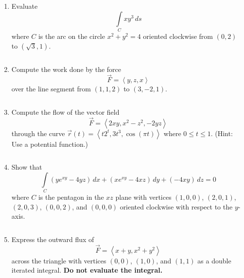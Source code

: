 \documentclass[12pt]{article}
\newcommand{\up}{$~$\vspace*{-0.7in}}
\newcommand{\liner}{\noindent\underline{\hspace*{7in}}}
\begin{document}
\begin{enumerate}

\item Evaluate \[ \int\limits_C xy^3\,ds\] where $C$ is the arc on the circle $x^2+y^2=4$ oriented clockwise from $(0,2)$ to $(\sqrt{3},1)$.

\vspace*{8in}

\liner

\newpage\up


\item Compute the work done by the force \[\vec{F}=\left<y,z,x\right>\] over the line segment from $(1,1,2)$ to $(3,-2,1)$.

\vspace*{8.5in}

\liner

\newpage\up


\item Compute the flow of the vector field \[\vec{F}=\left<2xy,x^2-z^2,-2yz\right>\] through the curve $\vec{r}(t)=\left<t2^t,3t^3,\cos(\pi t)\right>$ where $0\leq t\leq 1$. (Hint: Use a potential function.)

\vspace*{8.5in}

\liner

\newpage\up


\item Show that \[\int\limits_C (ye^{xy}-4yz)\,dx+(xe^{xy}-4xz)\,dy+(-4xy)\,dz = 0\] where $C$ is the pentagon in the $xz$ plane with vertices $(1,0,0)$, $(2,0,1)$, $(2,0,3)$, $(0,0,2)$, and $(0,0,0)$ oriented clockwise with respect to the $y$-axis.

\vspace*{8in}

\liner

\newpage\up


\item Express the outward flux of \[\vec{F}=\left<x+y,x^2+y^2\right>\] across the triangle with vertices $(0,0)$, $(1,0)$, and $(1,1)$ as a double iterated integral. \textbf{Do not evaluate the integral.}

\vspace*{8.5in}


\end{enumerate}
\end{document}
